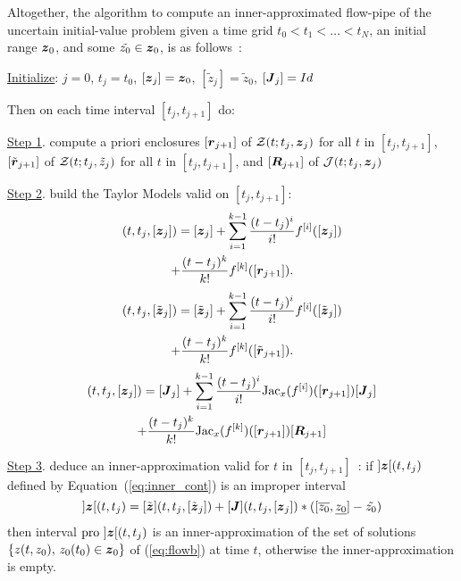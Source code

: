 \documentclass{sig-alternate-05-2015} %
\newcommand{\pro}{\mbox{pro }}
\begin{document}
Altogether, the algorithm to compute an inner-approxima\-ted flow-pipe of the uncertain initial-value problem given a time grid  $t_0 < t_1 < \ldots < t_N$, 
an initial range $\z_0$, and some $\tilde{z_0} \in \z_0$, is as follows~:
 {\par\smallskip                     %
  \begin{center}%
   \fbox%
   {\parbox{1.\linewidth}%
    { %
\underline{Initialize}: $j=0$, $t_j=t_0$, $[\z_j]=\z_0$, $[\tilde{z}_j]=\tilde{z}_0$, $[\J_j] = Id$

Then on each time interval $[t_j,t_{j+1}]$ do:

\underline{Step 1}. compute a priori enclosures $[\r_{j+1}]$  of  ${\cal Z}(t;t_j,\z_j)$ for all $t$ in $[t_j,t_{j+1}]$, $[\tilde{\r}_{j+1}]$  of  ${\cal Z}(t;t_j,\tilde{z}_j)$ for all $t$ in $[t_j,t_{j+1}]$,
and $[\bfm{R}_{j+1}]$ of ${\cal J}(t;t_j,\z_j)$

\underline{Step 2}. build the Taylor Models valid on $[t_j,t_{j+1}]$:
\begin{multline}
[\z](t,t_j,[{\z}_j]) = [{\z}_j] + \sum\limits_{i=1}^{k-1} \frac{(t-t_j)^i}{i !} f^{[i]}([{\z}_j])\\+ 
\frac{(t-t_j)^k}{k !} f^{[k]}([{\r}_{j+1}]).
\label{eq:TM1}
\end{multline}
\begin{multline}
[\tilde{\z}](t,t_j,[\tilde{\z}_j]) = [\tilde{\z}_j] + \sum\limits_{i=1}^{k-1} \frac{(t-t_j)^i}{i !} f^{[i]}([\tilde{\z}_j])\\+ \frac{(t-t_j)^k}{k !} f^{[k]}([\tilde{\r}_{j+1}]).
\label{eq:TM2}
\end{multline}
\begin{multline}
[\J](t,t_j,[{\z}_j]) = [{\J}_j] + \sum\limits_{i=1}^{k-1} \frac{(t-t_j)^i}{i !} \mbox{Jac}_x(f^{[i]})([{\r}_{j+1}]) [{\J}_j] \\ +  \frac{(t-t_j)^k}{k !} \mbox{Jac}_x(f^{[k]})([{\r}_{j+1}]) [\bfm{R}_{j+1}]
\label{eq:TM3}
\end{multline}

\underline{Step 3}. deduce an inner-approximation valid for $t$ in $[t_j,t_{j+1}]$~: if $]\z[(t,t_j)$ defined by Equation~(\ref{eq:inner_cont}) is an improper interval\\
\begin{equation} 
]\z[(t,t_j) = [\tilde{\z}](t,t_j,[\tilde{\z}_j]) + [\J](t,t_j,[{\z}_j])*([\overline{z_0},\underline{z_0}]-\tilde{z_0}) 
\label{eq:inner_cont}
\end{equation}
\noindent 
then interval $\pro]\z[(t,t_j)$ is an inner-approximation of  the set of solutions $\{ z(t,z_0), \, z_0(t_0) \in \z_0 \}$ of  (\ref{eq:flowb}) at time $t$,
otherwise the inner-approximation is empty.\\

}}
\end{center}}
\end{document}
